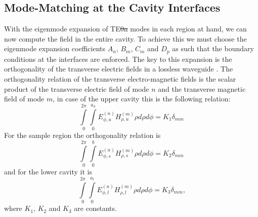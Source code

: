 \subsection{Mode-Matching at the Cavity Interfaces}
With the eigenmode expansion of TE\st{0n} modes in each region at hand, we can now compute the field in the entire cavity. To achieve this we must choose the eigenmode expansion coefficients $A_n$, $B_m$, $C_m$ and $D_p$ as such that the boundary conditions at the interfaces are enforced. The key to this expansion is the orthogonality of the transverse electric fields in a lossless waveguide \cite[Ch. 5.1]{collinFT}. The orthogonality relation of the transverse electro-magnetic fields is the scalar product of the transverse electric field of mode $n$ and the transverse magnetic field of mode $m$, in case of the upper cavity this is the following relation:
\begin{equation}\label{eq:o_u}
\int\limits_0^{2\pi}\int\limits_0^{a_u} E_{\phi,u}^{(n)}H_{\rho,u}^{(m)} \rho d\rho d\phi=K_1\delta_{mm}
\end{equation}
For the sample region the orthogonality relation is
\begin{equation}\label{eq:o_s}
\int\limits_0^{2\pi}\int\limits_0^{b} E_{\phi,s}^{(n)}H_{\rho,s}^{(m)} \rho d\rho d\phi=K_2\delta_{mm}
\end{equation}
and for the lower cavity it is
\begin{equation}\label{eq:o_l}
\int\limits_0^{2\pi}\int\limits_0^{a_l} E_{\phi,l}^{(n)}H_{\rho,l}^{(m)} \rho d\rho d\phi=K_3\delta_{mm}\text{,}
\end{equation}
where $K_1$, $K_2$ and $K_3$ are constants.

